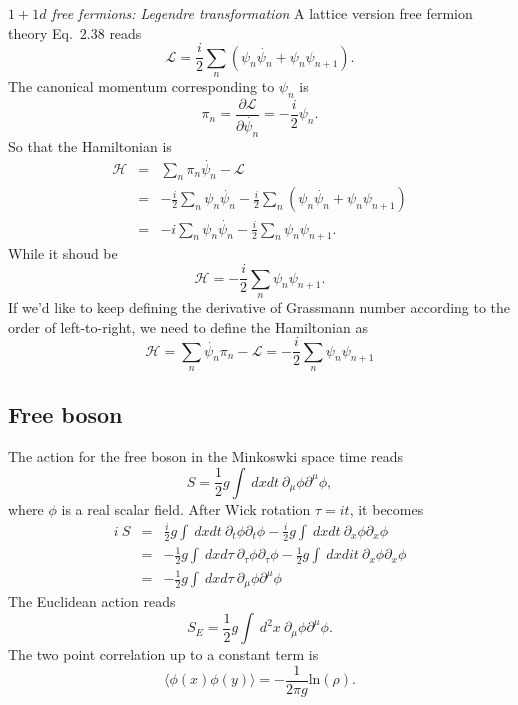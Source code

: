 \documentclass[submission, PhysLectNotes]{SciPost}
\begin{document}
{\it $1+1d$ free fermions: Legendre transformation}
A lattice version free fermion theory Eq.~$2.38$ reads
\begin{equation}
    \mathcal{L} = \frac{i}{2} \sum_n \left( \psi_n \dot{\psi_n} + \psi_n \psi_{n+1}\right).
\end{equation}
The canonical momentum corresponding to $\psi_n$ is
\begin{equation}
    \pi_n = \frac{\partial \mathcal{L}}{\partial \dot{\psi_n}} = -\frac{i}{2}\psi_n.
\end{equation}
So that the Hamiltonian is
\begin{eqnarray}
    \mathcal{H} &=& \sum_n \pi_n \dot{\psi_n} - \mathcal{L} \nonumber\\
      &=& -\frac{i}{2}\sum_n\psi_n \dot{\psi_n} - \frac{i}{2} \sum_n \left( \psi_n \dot{\psi_n} + \psi_n \psi_{n+1}\right) \\
      &=& -i \sum_n\psi_n \dot{\psi_n} - \frac{i}{2} \sum_n \psi_n \psi_{n+1} \nonumber.
\end{eqnarray}
While it shoud be
\begin{equation}
    \mathcal{H} = -\frac{i}{2}\sum_n\psi_n \psi_{n+1}.
\end{equation}
If we'd like to keep defining the derivative of Grassmann number according to the order of left-to-right, we need to define the Hamiltonian as
\begin{equation}
    \mathcal{H} = \sum_n \dot{\psi_n} \pi_n - \mathcal{L} =  - \frac{i}{2} \sum_n \psi_n \psi_{n+1}
\end{equation}

\subsection{Free boson}
The action for the free boson in the Minkoswki space time reads
\begin{equation}
    S = \frac{1}{2}g\int \ dxdt \ \partial_\mu \phi \partial^\mu \phi,
\end{equation}
where $\phi$ is a real scalar field. After Wick rotation $\tau = it$, it becomes
\begin{eqnarray}
    i\ S &=& \frac{i}{2}g\int \ dxdt \ \partial_t \phi \partial_t \phi - \frac{i}{2}g\int \ dxdt \ \partial_x \phi \partial_x \phi \nonumber \\
    &=& -\frac{1}{2}g\int \ dxd\tau \ \partial_\tau \phi \partial_\tau \phi - \frac{1}{2}g\int \ dxdit \ \partial_x \phi \partial_x \phi \nonumber \\
    &=& -\frac{1}{2}g\int \ dxd\tau \ \partial_\mu \phi \partial^\mu \phi
\end{eqnarray}
The Euclidean action reads
\begin{equation}
    S_E = \frac{1}{2}g\int \ d^2x \ \partial_\mu \phi \partial^\mu \phi.
\end{equation}
The two point correlation up to a constant term is
\begin{equation}
    \langle \phi(x) \phi(y) \rangle = -\frac{1}{2\pi g} \mathrm{ln} (\rho).
\end{equation}
\end{document}
